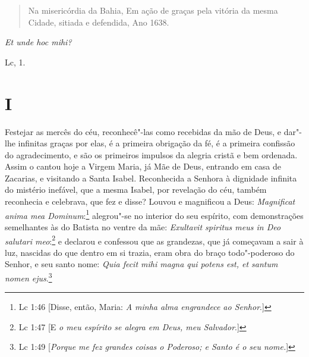 \begin{quotation}
\noindent{}Na misericórdia da Bahia,
Em ação de graças pela vitória da mesma Cidade,
sitiada e defendida, Ano 1638.
\end{quotation}

\epigraph{\emph{Et unde hoc mihi?}}{Lc, 1.\footnotemark}

\section{I}

\noindent{}Festejar as mercês do céu, reconhecê"-las como recebidas da mão de Deus,
e dar"-lhe infinitas graças por elas, é a primeira obrigação da fé, é a
primeira confissão do agradecimento, e são os primeiros impulsos da
alegria cristã e bem ordenada. Assim o cantou hoje a Virgem Maria, já
Mãe de Deus, entrando em casa de Zacarias, e visitando a Santa Isabel.
Reconhecida a Senhora à dignidade infinita do mistério inefável, que a
mesma Isabel, por revelação do céu, também reconhecia e celebrava, que
fez e disse? Louvou e magnificou a Deus: \emph{Magnificat anima mea
Dominum}:\footnote{Lc 1:46 [Disse, então, Maria: \textit{A minha alma engrandece ao Senhor}.]} alegrou"-se no interior do seu espírito, com
demonstrações semelhantes às do Batista no ventre da mãe:
\emph{Exultavit spiritus meus in Deo salutari meo}:\footnote{Lc 1:47 [E \textit{o meu espírito se alegra em Deus, meu Salvador}.]} e declarou e
confessou que as grandezas, que já começavam a sair à luz, nascidas do
que dentro em si trazia, eram obra do braço todo"-poderoso do Senhor, e
seu santo nome: \emph{Quia fecit mihi magna qui potens est, et santum
nomen ejus}.\footnote{Lc 1:49 [\textit{Porque me fez grandes coisas o Poderoso; e Santo é o seu nome.}]}

